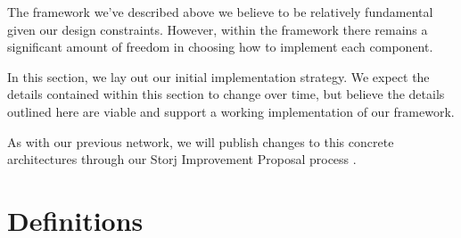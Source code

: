 \documentclass[11pt,fleqn,openany]{book}
\begin{document}
The framework we've described above we believe to be relatively fundamental
given our design constraints. However, within the framework there remains a
significant amount of freedom in choosing how to implement each component.

In this section, we lay out our initial implementation strategy. We expect
the details contained within this section to change over time, but believe the
details outlined here are viable and support a working implementation of our
framework.

As with our previous network, we will publish changes to this concrete
architectures through our Storj Improvement Proposal process \cite{sips}.

\section{Definitions}
\end{document}
